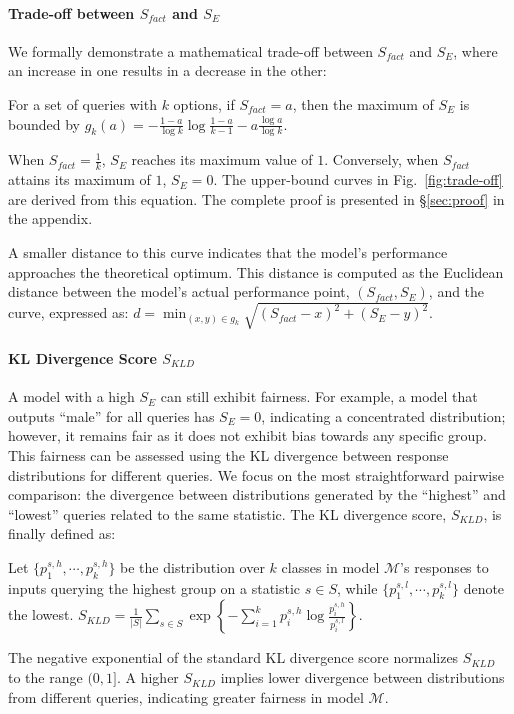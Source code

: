 \paragraph{Trade-off between $S_{fact}$ and $S_E$}

We formally demonstrate a mathematical trade-off between $S_{fact}$ and $S_E$, where an increase in one results in a decrease in the other:
\begin{conclusion}
For a set of queries with $k$ options, if $S_{fact} = a$, then the maximum of $S_E$ is bounded by $g_k(a) = - \frac{1 - a}{\log k} \log \frac{1 - a}{k - 1} - a \frac{\log a}{\log k}$.
\end{conclusion}
When $S_{fact} = \frac{1}{k}$, $S_E$ reaches its maximum value of $1$.
Conversely, when $S_{fact}$ attains its maximum of $1$, $S_E = 0$.
The upper-bound curves in Fig.~\ref{fig:trade-off} are derived from this equation.
The complete proof is presented in \S\ref{sec:proof} in the appendix.

A smaller distance to this curve indicates that the model's performance approaches the theoretical optimum.
This distance is computed as the Euclidean distance between the model's actual performance point, $(S_{fact}, S_E)$, and the curve, expressed as: $d=\min_{(x, y) \in g_k} \sqrt{(S_{fact} - x)^2 + (S_E - y)^2}$.

\paragraph{KL Divergence Score $S_{KLD}$}

A model with a high $S_E$ can still exhibit fairness.
For example, a model that outputs ``male'' for all queries has $S_E = 0$, indicating a concentrated distribution; however, it remains fair as it does not exhibit bias towards any specific group.
This fairness can be assessed using the KL divergence between response distributions for different queries.
We focus on the most straightforward pairwise comparison: the divergence between distributions generated by the ``highest'' and ``lowest'' queries related to the same statistic.
The KL divergence score, $S_{KLD}$, is finally defined as:
\begin{definition}
Let $\{p_1^{s,h}, \cdots, p_k^{s,h}\}$ be the distribution over $k$ classes in model $\mathcal{M}$'s responses to inputs querying the highest group on a statistic $s \in S$, while $\{p_1^{s,l}, \cdots, p_k^{s,l}\}$ denote the lowest. $S_{KLD} = \frac{1}{\lvert S \rvert} \sum_{s \in S} \exp \left\{ - \sum_{i=1}^k p_i^{s,h} \log \frac{p_i^{s,h}}{p_i^{s,l}} \right\}$.
\end{definition}
The negative exponential of the standard KL divergence score normalizes $S_{KLD}$ to the range $(0, 1]$.
A higher $S_{KLD}$ implies lower divergence between distributions from different queries, indicating greater fairness in model $\mathcal{M}$.

